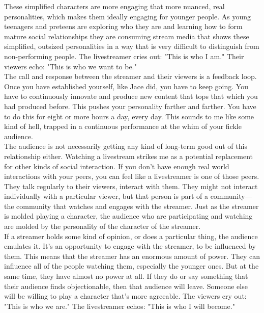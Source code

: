 \documentclass{article}
\begin{document}
These simplified characters are more engaging that more nuanced, real personalities, which makes them ideally engaging for younger people. As young teenagers and preteens are exploring who they are and learning how to form mature social relationships they are consuming stream media that shows these simplified, outsized personalities in a way that is very difficult to distinguish from non-performing people. The livestreamer cries out: "This is who I am." Their viewers echo: "This is who we want to be."\\

The call and response between the streamer and their viewers is a feedback loop. Once you have established yourself, like Jace did, you have to keep going. You have to continuously innovate and produce new content that tops that which you had produced before. This pushes your personality farther and farther. You have to do this for eight or more hours a day, every day. This sounds to me like some kind of hell, trapped in a continuous performance at the whim of your fickle audience.\\

The audience is not necessarily getting any kind of long-term good out of this relationship either. Watching a livestream strikes me as a potential replacement for other kinds of social interaction. If you don't have enough real world interactions with your peers, you can feel like a livestreamer is one of those peers. They talk regularly to their viewers, interact with them. They might not interact individually with a particular viewer, but that person is part of a community---the community that watches and engages with the streamer. Just as the streamer is molded playing a character, the audience who are participating and watching are molded by the personality of the character of the streamer.\\

If a streamer holds some kind of opinion, or does a particular thing, the audience emulates it. It's an opportunity to engage with the streamer, to be influenced by them. This means that the streamer has an enormous amount of power. They can influence all of the people watching them, especially the younger ones. But at the same time, they have almost no power at all. If they do or say something that their audience finds objectionable, then that audience will leave. Someone else will be willing to play a character that's more agreeable. The viewers cry out: "This is who we are." The livestreamer echos: "This is who I will become."\\
\end{document}
